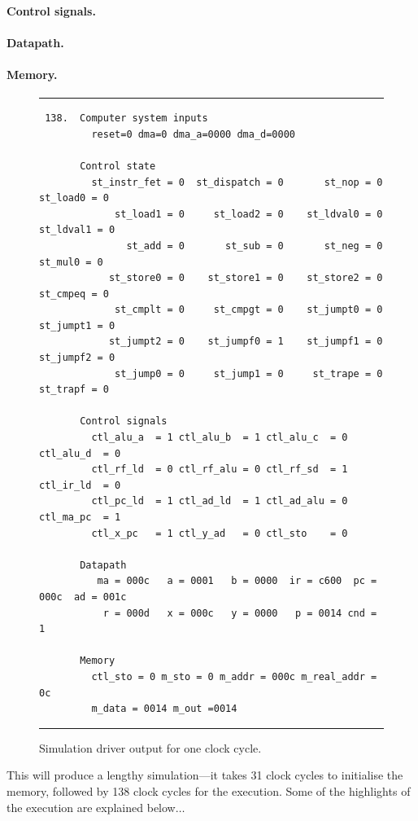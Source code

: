 \documentclass[a4paper,openany,fleqn]{book}
\begin{document}
\paragraph{Control signals.}
\label{sec:control-signals-1}


\paragraph{Datapath.}
\label{sec:datapath-1}


\paragraph{Memory.}
\label{sec:memory-2}



\begin{figure}
\noindent\hrule
{\footnotesize
\begin{verbatim}
 138.  Computer system inputs
         reset=0 dma=0 dma_a=0000 dma_d=0000

       Control state
         st_instr_fet = 0  st_dispatch = 0       st_nop = 0     st_load0 = 0
             st_load1 = 0     st_load2 = 0    st_ldval0 = 0    st_ldval1 = 0
               st_add = 0       st_sub = 0       st_neg = 0      st_mul0 = 0
            st_store0 = 0    st_store1 = 0    st_store2 = 0     st_cmpeq = 0
             st_cmplt = 0     st_cmpgt = 0    st_jumpt0 = 0    st_jumpt1 = 0
            st_jumpt2 = 0    st_jumpf0 = 1    st_jumpf1 = 0    st_jumpf2 = 0
             st_jump0 = 0     st_jump1 = 0     st_trape = 0     st_trapf = 0

       Control signals
         ctl_alu_a  = 1 ctl_alu_b  = 1 ctl_alu_c  = 0 ctl_alu_d  = 0
         ctl_rf_ld  = 0 ctl_rf_alu = 0 ctl_rf_sd  = 1 ctl_ir_ld  = 0
         ctl_pc_ld  = 1 ctl_ad_ld  = 1 ctl_ad_alu = 0 ctl_ma_pc  = 1
         ctl_x_pc   = 1 ctl_y_ad   = 0 ctl_sto    = 0

       Datapath
          ma = 000c   a = 0001   b = 0000  ir = c600  pc = 000c  ad = 001c
           r = 000d   x = 000c   y = 0000   p = 0014 cnd = 1

       Memory
         ctl_sto = 0 m_sto = 0 m_addr = 000c m_real_addr = 0c
         m_data = 0014 m_out =0014
\end{verbatim}
}
\noindent\hrule
\caption{Simulation driver output for one clock cycle.}
\label{fig:M1-sim-driver-output}
\end{figure}

This will produce a lengthy simulation---it takes 31 clock cycles to
initialise the memory, followed by 138 clock cycles for the execution.
Some of the highlights of the execution are explained below$\ldots$
\end{document}
